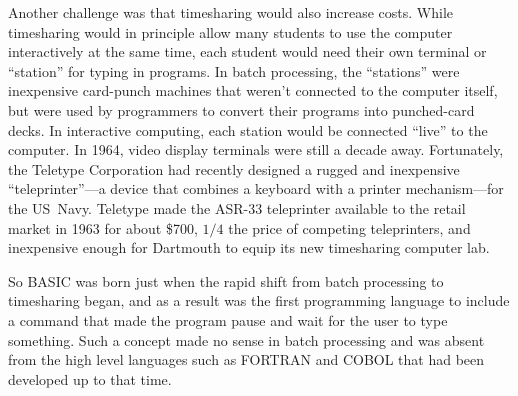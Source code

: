 Another challenge was that timesharing would also increase costs.
While timesharing would in principle allow many students to use the
computer interactively at the same time, each student
would need their own terminal or ``station'' for typing in programs.  In batch
processing, the ``stations'' were inexpensive card-punch machines
that weren't connected to the computer itself, but were used by programmers
to convert their programs into punched-card decks.  In interactive
computing, each station would be connected ``live'' to the computer.
In 1964, video display terminals were still a decade away.
Fortunately, the Teletype Corporation had recently designed a rugged and
inexpensive ``teleprinter''---a device that combines a keyboard with a
printer mechanism---for the US~Navy.
Teletype made the ASR-33 teleprinter
available to the retail market in 1963 for about \$700, $1/4$ the price of
competing teleprinters, and inexpensive enough for Dartmouth to equip
its new
timesharing computer lab.


So BASIC was born just when the rapid shift from batch processing to
timesharing began, and as a result
was the first programming language to include a command that made
the program pause and wait for the user to type
something.  Such a concept made no sense in batch processing and was
absent from the high level languages such as FORTRAN and COBOL that had
been developed up to that time.
 
